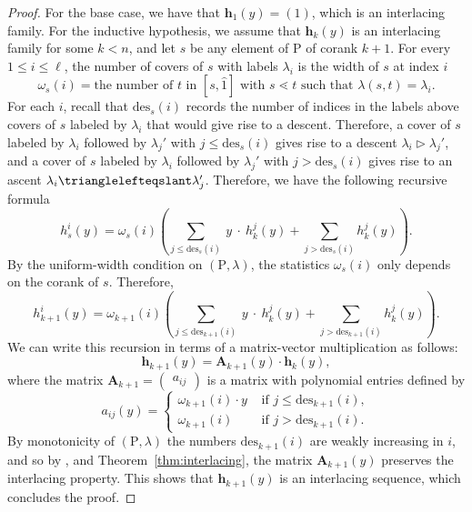 \documentclass[11pt,a4paper]{amsart}
\theoremstyle{results}
\theoremstyle{definitions}
\def\P{\mathbb{P}}
\newcommand{\des}{\mathrm{des}}
\newcommand{\un}{\hat{1}}
\renewcommand{\P}{\mathrm{P}}
\renewcommand{\hat}{\widehat}
\begin{document}
\begin{proof}
For the base case, we have that $\mathbf{h}_1(y) = (1)$, which is an interlacing family. For the inductive hypothesis, we assume that $\mathbf{h}_k(y)$ is an interlacing family for some $k < n$, and let $s$ be any element of $\P$ of corank $k+1$. For every $1 \leqslant i \leqslant \ell$, the number of covers of $s$ with labels $\lambda_i$ is the width of $s$ at index $i$
\[
\omega_s(i) = \text{the number of $t$ in $[s,\un]$ with $s \lessdot t$ such that $\lambda(s, t) = \lambda_i$}. 
\] 
For each $i$, recall that $\des_s(i)$ records the number of indices in the labels above covers of $s$ labeled by $\lambda_i$ that would give rise to a descent. Therefore, a cover of $s$ labeled by $\lambda_i$ followed by $\lambda_j'$ with $j \leqslant \des_s(i)$ gives rise to a descent $\lambda_i \vartriangleright \lambda_j'$, and a cover of $s$ labeled by $\lambda_i$ followed by $\lambda_j'$ with $j > \des_s(i)$ gives rise to an ascent $\lambda_i \trianglelefteqslant \lambda_j'$. Therefore, we have the following recursive formula
\begin{equation}\label{eq:h-recursion}
h_{s}^{i}(y) = \omega_{s}(i) \left(\sum_{j \leqslant \des_s(i)} \: y \: \cdot \: h_k^{j}(y) + \sum_{j > \des_s(i)} h_k^j(y) \right).
\end{equation}
By the uniform-width condition on $(\P, \lambda)$, the statistics $\omega_s(i)$ only depends on the corank of $s$. Therefore, 
\[
h_{k+1}^{i}(y) = \omega_{k+1}(i) \left(\sum_{j \leqslant \des_{k+1}(i)} \: y \: \cdot \: h_k^{j}(y) + \sum_{j > \des_{k+1}(i)} h_k^j(y) \right).
\]
We can write this recursion in terms of a matrix-vector multiplication as follows:  
\[
\mathbf{h}_{k+1}(y) = \mathbf{A}_{k+1}(y) \cdot \mathbf{h}_k(y), 
\] where the matrix $\mathbf{A}_{k+1} = \begin{pmatrix}a_{ij} \end{pmatrix}$ is a matrix with polynomial entries defined by 
\[
 a_{ij}(y) = \begin{cases}
\omega_{k+1}(i) \cdot y & \text{ if } j \leqslant \des_{k+1}(i), \\
\omega_{k+1}(i) & \text{ if } j > \des_{k+1}(i). 
\end{cases}
\]
By monotonicity of $(\P, \lambda)$ the numbers $\des_{k+1}(i)$ are weakly increasing in $i$, and so by , and Theorem~\ref{thm:interlacing}, the matrix $\mathbf{A}_{k+1}(y)$ preserves the interlacing property. This shows that $\mathbf{h}_{k+1}(y)$ is an interlacing sequence, which concludes the proof. 
\end{proof}
\end{document}
